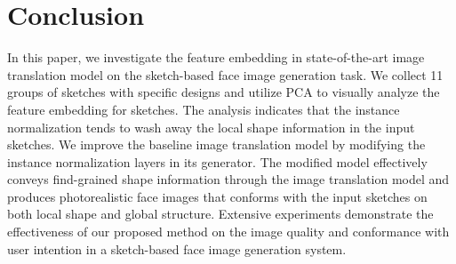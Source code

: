 \documentclass[10pt,twocolumn,letterpaper]{article}
\begin{document}
\section{Conclusion}
In this paper, we investigate the feature embedding in state-of-the-art image translation model on the sketch-based face image generation task.
We collect 11 groups of sketches with specific designs and utilize PCA to visually analyze the feature embedding for sketches.
The analysis indicates that the instance normalization tends to wash away the local shape information in the input sketches.
We improve the baseline image translation model by modifying the instance normalization layers in its generator.
The modified model effectively conveys find-grained shape information through the image translation model and produces photorealistic face images that conforms with the input sketches on both local shape and global structure.
Extensive experiments demonstrate the effectiveness of our proposed method on the image quality and conformance with user intention in a sketch-based face image generation system.  
\end{document}
